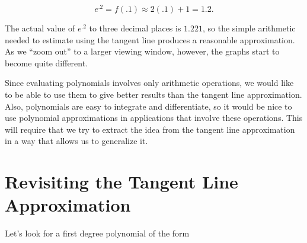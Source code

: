 \documentclass{ximera}
\begin{document}
\[
e^{.2} = f(.1) \approx 2(.1)+1 =1.2.
\]

The actual value of $e^{.2}$ to three decimal places is $1.221$, so
the simple arithmetic needed to estimate using the tangent line
produces a reasonable approximation.  As we ``zoom out'' to a larger
viewing window, however, the graphs start to become quite different.

\begin{image}
\end{image}

Since evaluating polynomials involves only arithmetic operations, we
would like to be able to use them to give better results than the
tangent line approximation. Also, polynomials are easy to integrate
and differentiate, so it would be nice to use polynomial
approximations in applications that involve these operations.  This
will require that we try to extract the idea from the tangent line
approximation in a way that allows us to generalize it.

\section{Revisiting the Tangent Line Approximation}
Let's look for a first degree polynomial of the form 
\end{document}
